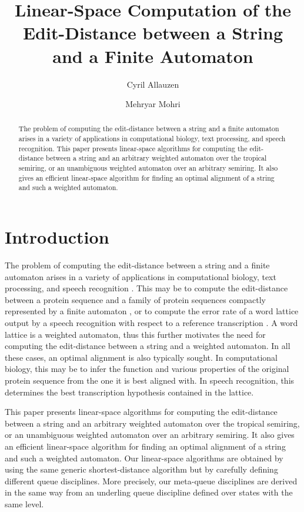 \documentclass{llncs}
\title{Linear-Space Computation of the Edit-Distance between a String 
  and a Finite Automaton}
\author{Cyril Allauzen \inst{1} \and Mehryar Mohri \inst{2,1}}
\institute{
        Google Research\\
        76 Ninth Avenue, New York, NY 10011, US.\\
        \and
	Courant Institute of Mathematical Sciences\\
	251 Mercer Street, New York, NY 10012, US.\\
}
\newcommand{\0}{\overline{0}}
\newcommand{\1}{\overline{1}}
\newcommand{\+}{\oplus}
\renewcommand{\.}{\otimes}
\begin{document}
\maketitle

\begin{abstract}
  The problem of computing the edit-distance between a string and a
  finite automaton arises in a variety of applications in
  computational biology, text processing, and speech recognition. This
  paper presents linear-space algorithms for computing the
  edit-distance between a string and an arbitrary weighted automaton
  over the tropical semiring, or an unambiguous weighted automaton
  over an arbitrary semiring. It also gives an efficient linear-space
  algorithm for finding an optimal alignment of a string and such a
  weighted automaton.
\end{abstract}

\section{Introduction}

The problem of computing the edit-distance between a string and a
finite automaton arises in a variety of applications in computational
biology, text processing, and speech recognition
\cite{durbin,gusfield,navarro-raffinot,pevzner,edit}. This may be to
compute the edit-distance between a protein sequence and a family of
protein sequences compactly represented by a finite automaton
\cite{durbin,gusfield,pevzner}, or to compute the error rate of a word
lattice output by a speech recognition with respect to a reference
transcription \cite{edit}. A word lattice is a weighted automaton,
thus this further motivates the need for computing the edit-distance
between a string and a weighted automaton. In all these cases, an
optimal alignment is also typically sought. In computational biology,
this may be to infer the function and various properties of the
original protein sequence from the one it is best aligned with. In
speech recognition, this determines the best transcription hypothesis
contained in the lattice.

This paper presents linear-space algorithms for computing the
edit-distance between a string and an arbitrary weighted automaton over
the tropical semiring, or an unambiguous weighted automaton over an
arbitrary semiring. It also gives an efficient linear-space algorithm
for finding an optimal alignment of a string and such a weighted
automaton. Our linear-space algorithms are obtained by using the same
generic shortest-distance algorithm but by carefully defining
different queue disciplines. More precisely, our meta-queue
disciplines are derived in the same way from an underling queue
discipline defined over states with the same level.
\end{document}
